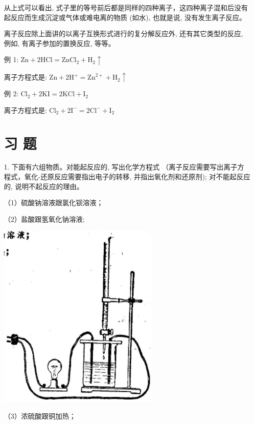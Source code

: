 \documentclass[10pt]{article}
\begin{document}
从上式可以看出, 式子里的等号前后都是同样的四种离子，这四种离子混和后没有起反应而生成沉淀或气体或难电离的物质 (如水), 也就是说, 没有发生离子反应。

离子反应除上面讲的以离子互换形式进行的复分解反应外, 还有其它类型的反应, 例如, 有离子参加的置换反应, 等等。

例 1: \(\mathrm{{Zn}} + 2\mathrm{{HCl}} = {\mathrm{{ZnCl}}}_{2} + {\mathrm{H}}_{2} \uparrow\)

离子方程式是: \(\mathrm{{Zn}} + 2{\mathrm{H}}^{ + } = {\mathrm{{Zn}}}^{2 + } + {\mathrm{H}}_{2} \uparrow\)

例 2: \({\mathrm{{Cl}}}_{2} + 2\mathrm{{KI}} = 2\mathrm{{KCl}} + {\mathrm{I}}_{2}\)

离子方程式是: \({\mathrm{{Cl}}}_{2} + 2{\mathrm{I}}^{ - } = 2{\mathrm{{Cl}}}^{ - } + {\mathrm{I}}_{2}\)

\section*{习 题}

1. 下面有六组物质。对能起反应的, 写出化学方程式 （离子反应需要写出离子方程式，氧化-还原反应需要指出电子的转移, 并指出氧化剂和还原剂); 对不能起反应的, 说明不起反应的理由。

（1）硫酸钠溶液跟氯化钡溶液；

（2）盐酸跟氢氧化钠溶液;

\begin{center}
\includegraphics[max width=0.6\textwidth]{images/01912d0f-097c-7e75-8f32-4f326cd86c9f_79_583876.jpg}
\end{center}

（3）浓硫酸跟铜加热；
\end{document}
